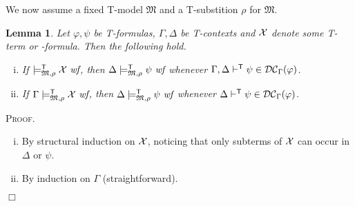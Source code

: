 \documentclass{article}
\newtheorem{lemma}[definition]{Lemma}
\newenvironment{proof}{\smallskip\textsc{Proof.}}{\hspace*{\fill}$\Box$}
\newcommand{\T}{\textsf T}
\newcommand{\wf}{\ \mbox{\em wf}}
\newcommand{\myvdash}[1]{\ensuremath{\vdash^{\mathsf{#1}}}}
\newcommand{\mymodelss}[3]{\ensuremath{\models_{\mathfrak{#2},{#3}}^{\mathsf{#1}}}}
\newcommand{\synDC}[1][{}]{\ifthenelse{\equal{#1}{}}{%
{\ensuremath{{\cal{DC}}}}}{%
{\ensuremath{{\cal{DC}}_{#1}}}}}
\begin{document}
\bigskip\noindent
We now assume a fixed {\T}-model $\mathfrak M$ and a {\T}-substition $\rho$
for $\mathfrak M$.

\begin{lemma}\label{synDCwf}
Let $\varphi,\psi$ be {\T}-formulas, $\Gamma,\Delta$ be {\T}-contexts
and $\cal X$ denote some {\T}-term or -formula.  Then the following hold.
\begin{enumerate}[(i)]
\item If $\mymodelss{T}M\rho{\cal X}\wf$, then
$\Delta\mymodelss{T}M\rho\psi\wf$ whenever
$\Gamma,\Delta\myvdash{T}\psi\in\synDC[\Gamma](\varphi)$.
\item If $\Gamma\mymodelss{T}M\rho{\cal X}\wf$, then
$\Delta\mymodelss{T}M\rho\psi\wf$ whenever
$\Delta\myvdash{T}\psi\in\synDC[\Gamma](\varphi)$.
\end{enumerate}
\end{lemma}
\begin{proof}
~\begin{enumerate}[(i)]
\item By structural induction on ${\cal X}$, noticing that only subterms of
${\cal X}$ can occur in $\Delta$ or $\psi$.
\item By induction on $\Gamma$ (straightforward).
\end{enumerate}
\end{proof}
\end{document}
